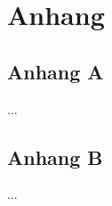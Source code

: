 \chapter*{Anhang}
\label{cap:Anhang}


\section*{Anhang A}
\label{sec:Anhang A}

...


\section*{Anhang B}
\label{sec:Anhang B}

...


